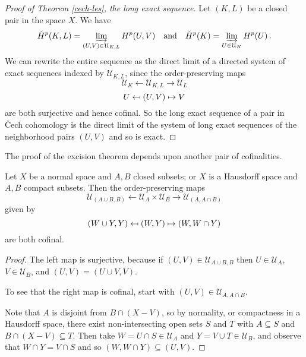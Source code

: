 \begin{proof}[Proof of Theorem \ref{cech-les}, the long exact sequence]
Let $(K,L)$ be a closed pair in the space $X$. We have
\[
\check{H}^p(K,L)=\varinjlim_{(U,V)\in\mathcal{U}_{K,L}}H^p(U,V)
\quad\hbox{and}\quad 
\check{H}^p(K)=\varinjlim_{U\in\mathcal{U}_K}H^p(U)\,.
\]
We can rewrite the entire sequence as
the direct limit of a directed system of exact sequences indexed by 
$\mathcal{U}_{K,L}$, since the order-preserving maps 
\[
\mathcal{U}_K \leftarrow \mathcal{U}_{K,L} \rightarrow \mathcal{U}_L 
\]
\[
U \mathrel{\reflectbox{$\mapsto$}} (U,V) \mapsto V
\]
are both surjective and hence cofinal. So the long exact sequence of a pair
in \v{C}ech cohomology is the direct limit of the system of long exact 
sequences of the neighborhood pairs $(U,V)$ and so is exact. 
\end{proof}

The proof of the excision theorem depends upon another pair of 
cofinalities.

\begin{lemma} Let $X$ be a normal space and $A,B$ closed subsets;
or $X$ is a Hausdorff space and $A, B$ compact subsets.  
Then the order-preserving maps
\[
\mathcal{U}_{(A\cup B,B)} \leftarrow \mathcal{U}_A\times\mathcal{U}_B 
\rightarrow \mathcal{U}_{(A,A\cap B)}
\]
given by
\[
(W\cup Y,Y)\mathrel{\reflectbox{$\mapsto$}}(W,Y)\mapsto(W,W\cap Y)
\]
are both cofinal.
\label{lem-cofinal} 
\end{lemma}
\begin{proof}
The left map is surjective, because if $(U,V)\in\mathcal{U}_{A\cup B,B}$
then $U\in\mathcal{U}_A$, $V\in\mathcal{U}_B$, and $(U,V)=(U\cup V,V)$. 

To see that the right map is cofinal, start with 
$(U,V)\in\mathcal{U}_{A,A\cap B}$.


\noindent
Note that $A$ is disjoint from $B\cap(X-V)$, so by normality,
or compactness in a Hausdorff space, there exist
non-intersecting open sets $S$ and $T$ with $A\subseteq S$ and 
$B\cap(X-V)\subseteq T$. Then take $W=U\cap S\in\mathcal{U}_A$ and 
$Y=V\cup T\in\mathcal{U}_B$, and observe that $W\cap Y=V\cap S$ and so 
$(W,W\cap Y)\subseteq(U,V)$.
\end{proof}

